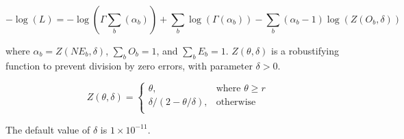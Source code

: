\begin{equation}
-\log \left(L \right) = -\log(\Gamma \sum\limits_b (\alpha_b)) + \sum\limits_b \log(\Gamma (\alpha_b)) - \sum\limits_b (\alpha_b-1) \log(Z(O_b,\delta))
\end{equation}

where $\alpha_b = Z \left(N E_b,\delta \right)$, $\sum\limits_b O_b = 1$, and $\sum\limits_b E_b = 1$. $Z \left(\theta,\delta \right)$ is a robustifying function to prevent division by zero errors, with parameter $\delta>0$.

\begin{equation}
Z \left(\theta,\delta \right) = \begin{cases}
\theta, & \text{where $\theta \ge r$} \\
\delta/\left( 2-\theta/\delta \right), & \text{otherwise} \\
\end{cases}
\end{equation}

The default value of $\delta$ is $1 \times 10^{-11}$.

%
%
%
%


